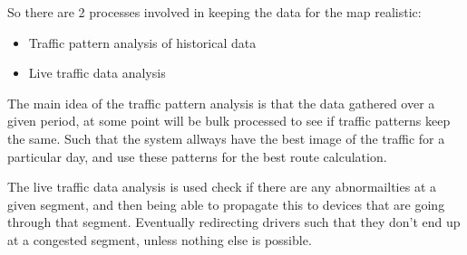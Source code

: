 So there are 2 processes involved in keeping the data for the map realistic:
\begin{itemize}
	\item Traffic pattern analysis of historical data
	\item Live traffic data analysis
\end{itemize}

The main idea of the traffic pattern analysis is that the data gathered over a given period, at some point will be bulk processed to see if traffic patterns keep the same. Such that the system allways have the best image of the traffic for a particular day, and use these patterns for the best route calculation.

The live traffic data analysis is used check if there are any abnormailties at a given segment, and then being able to propagate this to devices that are going through that segment. Eventually redirecting drivers such that they don't end up at a congested segment, unless nothing else is possible.